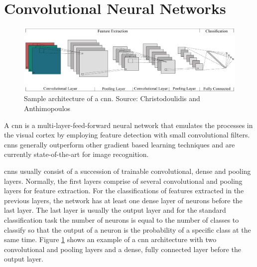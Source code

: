 \section{Convolutional Neural Networks}
\begin{figure}[ht]
	\centering
	\includegraphics[scale=0.35]{figures/theoryCNN_model}
	\caption{Sample architecture of a \gls{cnn}. Source: Christodoulidis and Anthimopoulos \cite{Christodoulidis2015}}
	\label{fig:cnnModel}
\end{figure}
A \acrfull{cnn} is a multi-layer-feed-forward neural network that emulates the processes in the visual cortex by employing feature detection with small convolutional filters. \glspl{cnn} generally outperform other gradient based learning techniques \cite{LeCun1998} and are currently state-of-the-art \cite{Russakovsky2015} for image recognition.

\glspl{cnn} usually consist of a succession of trainable convolutional, dense and pooling layers. Normally, the first layers comprise of several convolutional and pooling layers for feature extraction. For the classifications of features extracted in the previous layers, the network has at least one dense layer of neurons before the last layer. The last layer is usually the output layer and for the standard classification task the number of neurons is equal to the number of classes to classify so that the output of a neuron is the probability of a specific class at the same time. Figure \ref{fig:cnnModel} shows an example of a \gls{cnn} architecture with two convolutional and pooling layers and a dense, fully connected layer before the output layer. 

